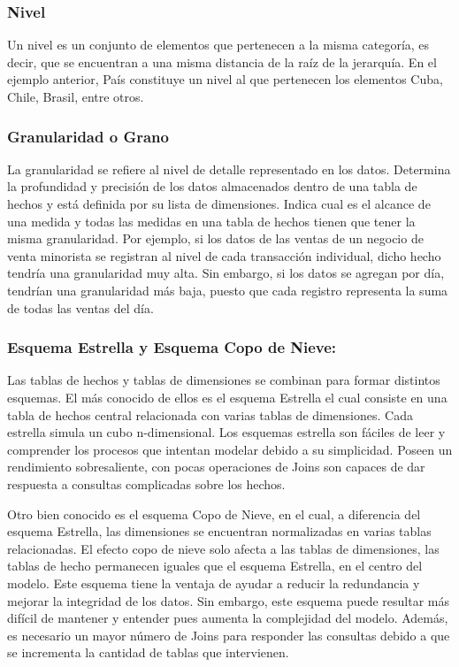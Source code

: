 \subsubsection{Nivel}

Un nivel es un conjunto de elementos que pertenecen a la misma categoría, es decir, que se encuentran a una misma distancia 
de la raíz de la jerarquía. En el ejemplo anterior, Pa\'is constituye un nivel al que pertenecen los elementos Cuba, Chile, 
Brasil, entre otros.

\subsubsection{Granularidad o Grano}

La granularidad se refiere al nivel de detalle representado en los datos. Determina 
la profundidad y precisión de los datos almacenados dentro de una tabla de hechos y est\'a definida por su lista de dimensiones. 
Indica cual es el alcance de una medida y todas las medidas en una tabla de hechos tienen que tener la misma 
granularidad\cite{kimball2011data}. Por ejemplo, si los datos de las ventas de un negocio de venta minorista 
se registran al nivel de cada transacción individual, dicho hecho tendr\'ia una granularidad muy alta. Sin embargo, 
si los datos se agregan por d\'ia, tendrían una granularidad m\'as baja, puesto que cada registro representa la suma 
de todas las ventas del d\'ia.

\subsubsection{Esquema Estrella y Esquema Copo de Nieve:}

Las tablas de hechos y tablas de dimensiones se combinan para formar distintos esquemas. El m\'as conocido 
de ellos es el esquema Estrella el cual consiste en una tabla de hechos central relacionada con varias tablas 
de dimensiones. Cada estrella simula un cubo n-dimensional. Los esquemas estrella son f\'aciles de leer y comprender 
los procesos que intentan modelar debido 
a su simplicidad. Poseen un rendimiento sobresaliente, con pocas operaciones de Joins son capaces de dar respuesta 
a consultas complicadas sobre los hechos.

Otro bien conocido es el esquema Copo de Nieve, en el cual, a diferencia del esquema Estrella, las dimensiones se encuentran 
normalizadas en varias tablas relacionadas. El efecto copo de nieve solo afecta a las tablas de dimensiones, las tablas de hecho 
permanecen iguales que el esquema Estrella, en el centro del modelo. Este esquema tiene la ventaja de ayudar a reducir la redundancia 
y mejorar la integridad de los datos. Sin embargo, este esquema puede resultar m\'as difícil de mantener y entender pues aumenta 
la complejidad del modelo. Adem\'as, es necesario un mayor n\'umero de Joins para responder las consultas debido a que se incrementa
la cantidad de tablas que intervienen.


